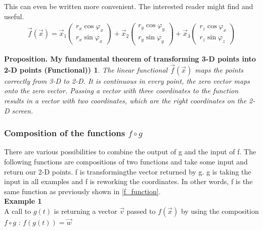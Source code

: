 \documentclass[a4paper]{article}
\begin{document}
\begin{Example}
This can even be written more convenient. The interested reader might find \cite{Corral1} and \cite{Strang2} useful. \\

\begin{displaymath}
\begin{align}
			\vec{f}(\vec{x}) = \vec{x}_{1}\begin{pmatrix}r_x\cos\varphi_x\\r_x\sin\varphi_x\end{pmatrix} + \vec{x}_{2}\begin{pmatrix}r_y\cos\varphi_y\\r_y\sin\varphi_y\end{pmatrix} + \vec{x}_{3}\begin{pmatrix}r_z\cos\varphi_x\\r_z\sin\varphi_z\end{pmatrix}
	\end{align}
\end{displaymath}


\newtheorem{FunctionalVersion}{Proposition. My fundamental theorem of transforming 3-D points into 2-D points (Functional))}
\begin{FunctionalVersion}
The linear functional $\vec{f}(\vec{x})$ maps the points correctly from 3-D to 2-D. It is continuous in every point, the zero vector maps onto the zero vector. Passing a vector with three coordinates to the function results in a vector with two coordinates, which are the right coordinates on the 2-D screen.
\end{FunctionalVersion}


\subsubsection{Composition of the functions $f \circ g$}

There are various possibilities to combine the output of g and the input of f.
The following functions are compositions of two functions and take some input and return our 2-D points.
f is transformingthe vector returned by g. g is taking the input in all examples and f is reworking the coordinates.
In other words, f is the same function as previously shown in \ref{f_function}.\\

\textbf{Example 1}\\

A call to $g(t)$ is returning a vector $\vec{v}$ passed to $f(\vec{x})$ by using the composition $f \circ g$ :  $f(g(t)) = \vec{w}$\\


\end{Example}
\end{document}
